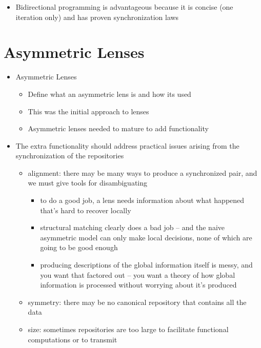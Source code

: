 \begin{itemize}
    \item Bidirectional programming is advantageous because it is concise
        (one iteration only) and has proven synchronization laws
\end{itemize}

\section{Asymmetric Lenses}
\label{sec:asymmetric-lenses}
\begin{itemize}
    \item Asymmetric Lenses
        \begin{itemize}
            \item Define what an asymmetric lens is and how its used
            \item This was the initial approach to lenses
            \item Asymmetric lenses needed to mature to add functionality
        \end{itemize}
    \item The extra functionality should address practical issues arising
        from the synchronization of the repositories
        \begin{itemize}
            \item alignment: there may be many ways to produce a
                synchronized pair, and we must give tools for disambiguating
                \begin{itemize}
                    \item to do a good job, a lens needs information about
                        what happened that's hard to recover locally
                    \item structural matching clearly does a bad job -- and
                        the naive asymmetric model can only make local
                        decisions, none of which are going to be good enough
                    \item producing descriptions of the global information
                        itself is messy, and you want that factored out --
                        you want a theory of how global information is
                        processed without worrying about it's produced
                \end{itemize}
            \item symmetry: there may be no canonical repository that
                contains all the data
            \item size: sometimes repositories are too large to facilitate
                functional computations or to transmit
        \end{itemize}
\end{itemize}

